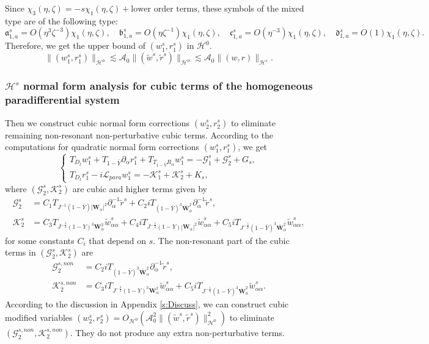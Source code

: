 \documentclass[10pt]{amsart}
\theoremstyle{remark}
\theoremstyle{definition}
\numberwithin{equation}{section}
\newcommand{\p}{\partial}
\renewcommand{\H}{{\mathcal H }}
\newcommand{\al}{\alpha}
\newcommand{\f}{\frac}
\newcommand{\bw}{\mathbf{W}}
\newcommand{\CalAZ}{{\mathcal{A}_0}}
\begin{document}
Since $\chi_3(\eta, \zeta) = -s\chi_1(\eta,\zeta) + \text{lower order terms}$, these symbols of the mixed type are of the following type:
\begin{equation*}
\mathfrak{a}^s_{1, a} = O(\eta^3 \zeta^{-3})\chi_{1}(\eta, \zeta), \quad \mathfrak{b}^s_{1, a} = O(\eta\zeta^{-1})\chi_{1}(\eta, \zeta),  \quad \mathfrak{c}^s_{1, a} =O(\eta^{-3})\chi_{1}(\eta, \zeta), \quad \mathfrak{d}^s_{1, a}  = O(1)\chi_{1}(\eta, \zeta).
\end{equation*}
Therefore, we get the upper bound of $(w^s_1, r^s_1)$ in $\H^0$.
\begin{equation*}
    \|(w^s_1, r^s_1)\|_{\H^0} \lesssim \CalAZ \|(\tilde{w}^s, \tilde{r}^s)\|_{\H^0}  \lesssim \CalAZ \|(w,r)\|_{\H^s}.
\end{equation*}

\subsubsection{$\H^s$ normal form analysis for cubic terms of the homogeneous paradifferential system}
Then we construct cubic normal form corrections $(w^s_2, r^s_2)$ to eliminate remaining non-resonant non-perturbative cubic terms.
According to the computations for quadratic normal form corrections $(w^s_1, r^s_1)$, we get 
\begin{equation*} 
\begin{cases}
T_{D_t}w^s_1 +T_{1-\bar{Y}}\p_\al r^s_1+T_{T_{1-\bar{Y}}R_{\al}}w^s_1= -\mathcal{G}^s_1 + \mathcal{G}^s_2+G_s,\\
T_{D_t}r^s_1-i\mathcal{L}_{para}w^s_1 = -\mathcal{K}^s_1  +\mathcal{K}^s_2  +K_s,
\end{cases}
\end{equation*}
where $(\mathcal{G}^s_2, \mathcal{K}^s_2)$ are cubic and higher terms given by
\begin{align*}
\mathcal{G}^s_2 &=  C_1 T_{J^{-1}(1-\bar{Y}) |\bw_\al|^2} \partial_\al^{-1}\tilde{r}^s + C_2i T_{(1-\bar{Y})^3 \bar{\bw}_\al^2} \partial_\al^{-1}\tilde{r}^s,\\
\mathcal{K}^s_2 &=  C_3 T_{J^{-\f32}(1-Y)^3\bw^2_\al} \tilde{w}_{\al \al}^s + C_4i T_{J^{-\f52}(1-Y)|\bw_\al|^2} \tilde{w}_{\al \al}^s + C_5i T_{J^{-\f52}(1-\bar{Y})^3 \bar{\bw}^2_\al} \tilde{w}_{\al \al}^s ,
\end{align*}
for some constants $C_i$ that depend on $s$.
The non-resonant part of the cubic terms in $(\mathcal{G}^s_2, \mathcal{K}^s_2)$ are 
\begin{align*}
\mathcal{G}^{s,non}_2 &=   C_2i T_{(1-\bar{Y})^3 \bar{\bw}_\al^2} \partial_\al^{-1}\tilde{r}^s,\\
\mathcal{K}^{s,non}_2 &=  C_3i T_{J^{-\f32}(1-Y)^3\bw^2_\al} \tilde{w}_{\al \al}^s + C_5i T_{J^{-\f52}(1-\bar{Y})^3 \bar{\bw}^2_\al} \tilde{w}_{\al \al}^s .
\end{align*}
According to the discussion in Appendix \ref{s:Discuss}, we can construct cubic modified variables  $(w^s_2, r^s_2) = O_{\H^0}(\mathcal{A}_0^2\|(\tilde{w}^s, \tilde{r}^s)\|^2_{\H^0})$ to eliminate $(\mathcal{G}^{s,non}_2, \mathcal{K}^{s,non}_2)$.
They do not produce any extra non-perturbative terms.
\end{document}
